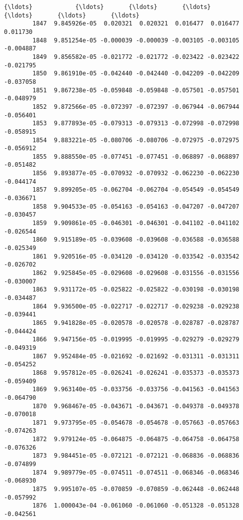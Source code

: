 \documentclass[11pt]{article}
\begin{document}
\begin{Verbatim}[commandchars=\\\{\}]
        {\ldots}            {\ldots}       {\ldots}       {\ldots}       {\ldots}       {\ldots}       {\ldots}   
        1847  9.845926e-05  0.020321  0.020321  0.016477  0.016477  0.011730   
        1848  9.851254e-05 -0.000039 -0.000039 -0.003105 -0.003105 -0.004887   
        1849  9.856582e-05 -0.021772 -0.021772 -0.023422 -0.023422 -0.021795   
        1850  9.861910e-05 -0.042440 -0.042440 -0.042209 -0.042209 -0.037058   
        1851  9.867238e-05 -0.059848 -0.059848 -0.057501 -0.057501 -0.048979   
        1852  9.872566e-05 -0.072397 -0.072397 -0.067944 -0.067944 -0.056401   
        1853  9.877893e-05 -0.079313 -0.079313 -0.072998 -0.072998 -0.058915   
        1854  9.883221e-05 -0.080706 -0.080706 -0.072975 -0.072975 -0.056912   
        1855  9.888550e-05 -0.077451 -0.077451 -0.068897 -0.068897 -0.051482   
        1856  9.893877e-05 -0.070932 -0.070932 -0.062230 -0.062230 -0.044174   
        1857  9.899205e-05 -0.062704 -0.062704 -0.054549 -0.054549 -0.036671   
        1858  9.904533e-05 -0.054163 -0.054163 -0.047207 -0.047207 -0.030457   
        1859  9.909861e-05 -0.046301 -0.046301 -0.041102 -0.041102 -0.026544   
        1860  9.915189e-05 -0.039608 -0.039608 -0.036588 -0.036588 -0.025349   
        1861  9.920516e-05 -0.034120 -0.034120 -0.033542 -0.033542 -0.026702   
        1862  9.925845e-05 -0.029608 -0.029608 -0.031556 -0.031556 -0.030007   
        1863  9.931172e-05 -0.025822 -0.025822 -0.030198 -0.030198 -0.034487   
        1864  9.936500e-05 -0.022717 -0.022717 -0.029238 -0.029238 -0.039441   
        1865  9.941828e-05 -0.020578 -0.020578 -0.028787 -0.028787 -0.044424   
        1866  9.947156e-05 -0.019995 -0.019995 -0.029279 -0.029279 -0.049319   
        1867  9.952484e-05 -0.021692 -0.021692 -0.031311 -0.031311 -0.054252   
        1868  9.957812e-05 -0.026241 -0.026241 -0.035373 -0.035373 -0.059409   
        1869  9.963140e-05 -0.033756 -0.033756 -0.041563 -0.041563 -0.064790   
        1870  9.968467e-05 -0.043671 -0.043671 -0.049378 -0.049378 -0.070018   
        1871  9.973795e-05 -0.054678 -0.054678 -0.057663 -0.057663 -0.074263   
        1872  9.979124e-05 -0.064875 -0.064875 -0.064758 -0.064758 -0.076326   
        1873  9.984451e-05 -0.072121 -0.072121 -0.068836 -0.068836 -0.074899   
        1874  9.989779e-05 -0.074511 -0.074511 -0.068346 -0.068346 -0.068930   
        1875  9.995107e-05 -0.070859 -0.070859 -0.062448 -0.062448 -0.057992   
        1876  1.000043e-04 -0.061060 -0.061060 -0.051328 -0.051328 -0.042561   
        

\end{Verbatim}
\end{document}
